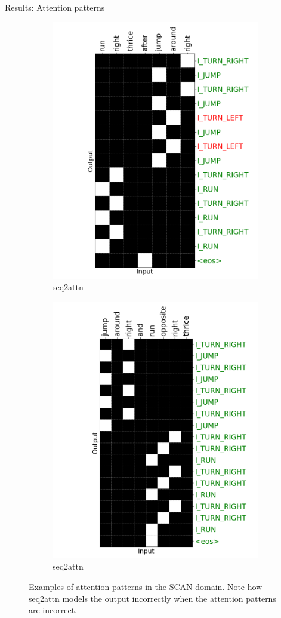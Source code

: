 \documentclass[final,hyperref={pdfpagelabels=false}]{beamer}
\begin{document}
\begin{frame}[t]
\begin{columns}[t]
\begin{column}{.465\textwidth}
\begin{block}{Results: Attention patterns}
\begin{figure}
\begin{subfigure}{.33\linewidth}
		\includegraphics[width=0.77\linewidth,trim={3cm 0cm 0.9cm 0cm},clip]{Figures/attn_seq2attn_scan_incorrect}
		\caption{seq2attn}
		\label{fig:scan_attn_seq2attn_incorrect}
	\end{subfigure}%
	\begin{subfigure}{.33\linewidth}
		\centering
		\includegraphics[width=0.77\linewidth,trim={3cm 0cm 0.9cm 0cm},clip]{Figures/attn_seq2attn_scan_correct}
		\caption{seq2attn}
		\label{fig:scan_attn_seq2attn_correct}
	\end{subfigure}
	\caption{Examples of attention patterns in the SCAN domain. Note how seq2attn models the output incorrectly when the attention patterns are incorrect.}
	\label{fig:scan_attn}
\end{figure}


\end{block}
\end{column}
\end{columns}
\end{frame}
\end{document}
